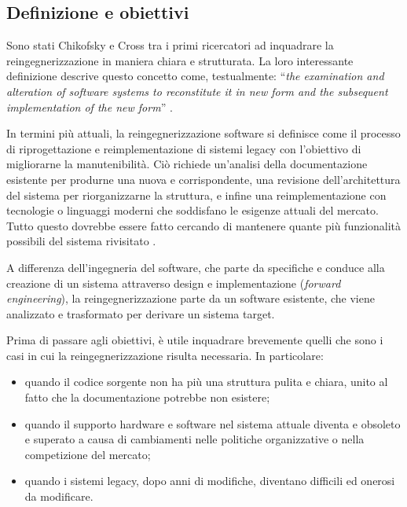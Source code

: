 \subsection{Definizione e obiettivi}
Sono stati Chikofsky e Cross tra i primi ricercatori ad inquadrare la reingegnerizzazione in maniera chiara e strutturata. La loro interessante definizione descrive questo concetto come, testualmente: ``\textit{the examination and alteration of software systems to reconstitute it in new form and the subsequent implementation of the new form}'' \cite{Chikofsky1990}.

In termini più attuali, la reingegnerizzazione software si definisce come il processo di riprogettazione e reimplementazione di sistemi legacy con l'obiettivo di migliorarne la manutenibilità. Ciò richiede un'analisi della documentazione esistente per produrne una nuova e corrispondente, una revisione dell'architettura del sistema per riorganizzarne la struttura, e infine una reimplementazione con tecnologie o linguaggi moderni che soddisfano le esigenze attuali del mercato. Tutto questo dovrebbe essere fatto cercando di mantenere quante più funzionalità possibili del sistema rivisitato \cite{sommerville2011software}.

A differenza dell'ingegneria del software, che parte da specifiche e conduce alla creazione di un sistema attraverso design e implementazione (\emph{forward engineering}), la reingegnerizzazione parte da un software esistente, che viene analizzato e trasformato per derivare un sistema target.

Prima di passare agli obiettivi, è utile inquadrare brevemente quelli che sono i casi in cui la reingegnerizzazione risulta necessaria. In particolare:
\begin{itemize}
  \item quando il codice sorgente non ha più una struttura pulita e chiara, unito al fatto che la documentazione potrebbe non esistere;
  \item quando il supporto hardware e software nel sistema attuale diventa e obsoleto e superato a causa di cambiamenti nelle politiche organizzative o nella competizione del mercato;
  \item quando i sistemi legacy, dopo anni di modifiche, diventano difficili ed onerosi da modificare.
\end{itemize}

